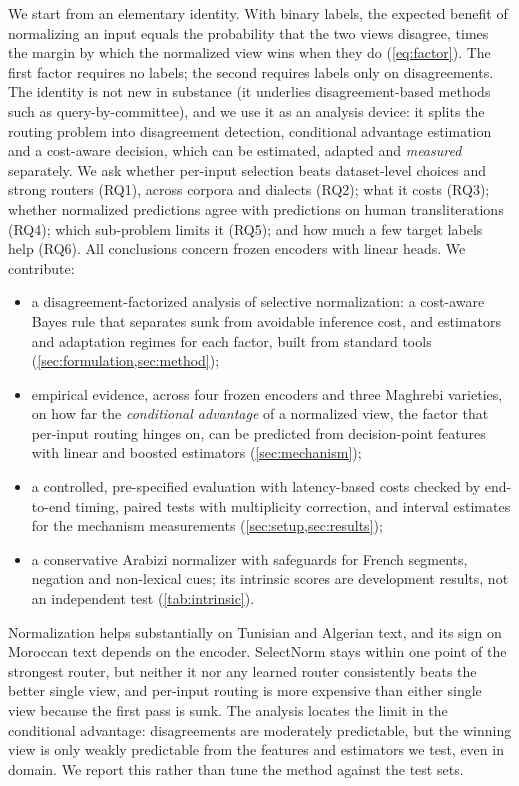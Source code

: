 We start from an elementary identity. With binary labels, the expected benefit of normalizing an input equals the probability that the two views disagree, times the margin by which the normalized view wins when they do (\cref{eq:factor}). The first factor requires no labels; the second requires labels only on disagreements. The identity is not new in substance (it underlies disagreement-based methods such as query-by-committee), and we use it as an analysis device: it splits the routing problem into disagreement detection, conditional advantage estimation and a cost-aware decision, which can be estimated, adapted and \emph{measured} separately. We ask whether per-input selection beats dataset-level choices and strong routers (RQ1), across corpora and dialects (RQ2); what it costs (RQ3); whether normalized predictions agree with predictions on human transliterations (RQ4); which sub-problem limits it (RQ5); and how much a few target labels help (RQ6). All conclusions concern frozen encoders with linear heads. We contribute:
\begin{itemize}[leftmargin=1.2em,itemsep=0pt,topsep=2pt]
\item a disagreement-factorized analysis of selective normalization: a cost-aware Bayes rule that separates sunk from avoidable inference cost, and estimators and adaptation regimes for each factor, built from standard tools (\cref{sec:formulation,sec:method});
\item empirical evidence, across four frozen encoders and three Maghrebi varieties, on how far the \emph{conditional advantage} of a normalized view, the factor that per-input routing hinges on, can be predicted from decision-point features with linear and boosted estimators (\cref{sec:mechanism});
\item a controlled, pre-specified evaluation with latency-based costs checked by end-to-end timing, paired tests with multiplicity correction, and interval estimates for the mechanism measurements (\cref{sec:setup,sec:results});
\item a conservative Arabizi normalizer with safeguards for French segments, negation and non-lexical cues; its intrinsic scores are development results, not an independent test (\cref{tab:intrinsic}).
\end{itemize}
Normalization helps substantially on Tunisian and Algerian text, and its sign on Moroccan text depends on the encoder. SelectNorm stays within one point of the strongest router, but neither it nor any learned router consistently beats the better single view, and per-input routing is more expensive than either single view because the first pass is sunk. The analysis locates the limit in the conditional advantage: disagreements are moderately predictable, but the winning view is only weakly predictable from the features and estimators we test, even in domain. We report this rather than tune the method against the test sets.
